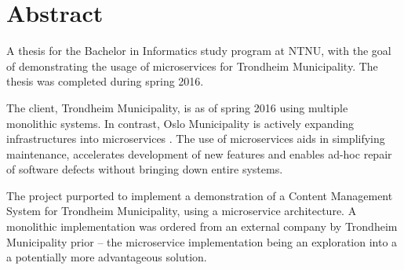 
\section*{Abstract}
\label{chapterAbstract}


A thesis for the Bachelor in Informatics study program at NTNU, with the goal of demonstrating the usage of microservices for Trondheim Municipality. The thesis was completed during spring 2016.

The client, Trondheim Municipality, is 
as of spring 2016 using multiple monolithic systems. In contrast, Oslo Municipality is actively expanding infrastructures into microservices \citep{osloMicroservices}.
The use of microservices aids in simplifying maintenance, accelerates development of new features and enables ad-hoc repair of software defects without bringing down entire systems. 

The project purported to implement a demonstration of a Content Management System for Trondheim Municipality, using a microservice architecture. A monolithic implementation was ordered from an external company by Trondheim Municipality prior -- the microservice implementation being an exploration into a a potentially more advantageous solution.

